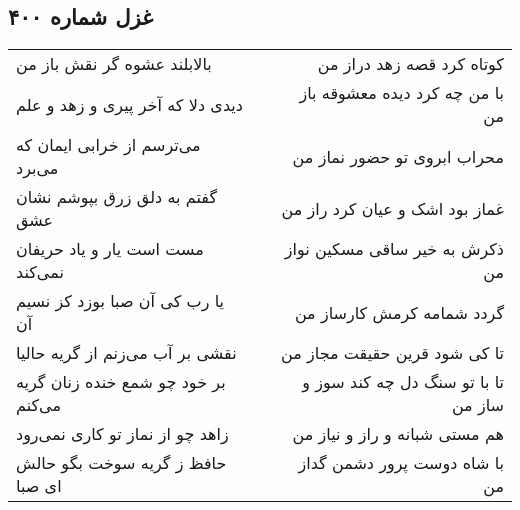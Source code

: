 \begin{center}
\section*{غزل شماره ۴۰۰}
\label{sec:sh400}
\begin{longtable}{l p{0.5cm} r}
بالابلند عشوه گر نقش باز من
&&
کوتاه کرد قصه زهد دراز من
\\
دیدی دلا که آخر پیری و زهد و علم
&&
با من چه کرد دیده معشوقه باز من
\\
می‌ترسم از خرابی ایمان که می‌برد
&&
محراب ابروی تو حضور نماز من
\\
گفتم به دلق زرق بپوشم نشان عشق
&&
غماز بود اشک و عیان کرد راز من
\\
مست است یار و یاد حریفان نمی‌کند
&&
ذکرش به خیر ساقی مسکین نواز من
\\
یا رب کی آن صبا بوزد کز نسیم آن
&&
گردد شمامه کرمش کارساز من
\\
نقشی بر آب می‌زنم از گریه حالیا
&&
تا کی شود قرین حقیقت مجاز من
\\
بر خود چو شمع خنده زنان گریه می‌کنم
&&
تا با تو سنگ دل چه کند سوز و ساز من
\\
زاهد چو از نماز تو کاری نمی‌رود
&&
هم مستی شبانه و راز و نیاز من
\\
حافظ ز گریه سوخت بگو حالش ای صبا
&&
با شاه دوست پرور دشمن گداز من
\\
\end{longtable}
\end{center}
